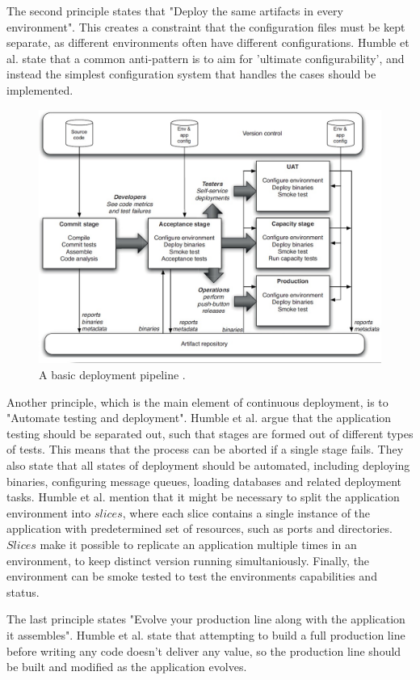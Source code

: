 \documentclass[english]{tktltiki2}
\theoremstyle{definition}
\theoremstyle{remark}
\begin{document}
The second principle states that "Deploy the same artifacts in every environment". This creates a constraint that the configuration files must be kept separate, as different environments often have different configurations. Humble et al. state that a common anti-pattern is to aim for 'ultimate configurability', and instead the simplest configuration system that handles the cases should be implemented.
\begin{figure}[h]
	\centering
	\includegraphics[width=5.0in]{pipeline.jpg}
	\caption{A basic deployment pipeline \cite{cdbook}.}
	\label{fig2}
\end{figure}
Another principle, which is the main element of continuous deployment, is to "Automate testing and deployment". Humble et al. argue that the application testing should be separated out, such that stages are formed out of different types of tests. This means that the process can be aborted if a single stage fails. They also state that all states of deployment should be automated, including deploying binaries, configuring message queues, loading databases and related deployment tasks. Humble et al. mention that it might be necessary to split the application environment into $slices$, where each slice contains a single instance of the application with predetermined set of resources, such as ports and directories. $Slices$ make it possible to replicate an application multiple times in an environment, to keep distinct version running simultaniously. Finally, the environment can be smoke tested to test the environments capabilities and status.

The last principle states "Evolve your production line along with the application it assembles". Humble et al. state that attempting to build a full production line before writing any code doesn't deliver any value, so the production line should be built and modified as the application evolves. 
\end{document}
